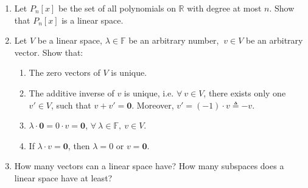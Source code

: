 \documentclass[11pt,letter,notitlepage]{article}
\theoremstyle{definition}
\begin{document}
\newpage
\begin{exercise}
\begin{enumerate}
    \item Let $P_n[x]$ be the set of all polynomials on $\mathbb{R}$ with degree at most $n$. Show that $P_n[x]$ is a linear space.
    \item Let $V$ be a linear space, $\lambda\in \mathbb{F}$ be an arbitrary number, $\ v\in V$ be an arbitrary vector. Show that:
    \begin{enumerate}
        \item The zero vectors of $V$ is unique.
        \item The additive inverse of $v$ is unique, i.e. $\forall\ v\in V$, there exists only one $v'\in V$, such that $v+v'=\mathbf{0}$. Moreover, $v' = (-1)\cdot v \triangleq -v$.
        \item $\lambda\cdot \mathbf{0}=0\cdot v=\mathbf{0}$, $\forall\ \lambda\in \mathbb{F},\ v\in V$.
        \item If $\lambda\cdot v=\mathbf{0}$, then $\lambda=0$ or $v=\mathbf{0}$.
    \end{enumerate}
    \item How many vectors can a linear space have? How many subspaces does a linear space have at least?
\end{enumerate}
    
\end{exercise}
\end{document}
